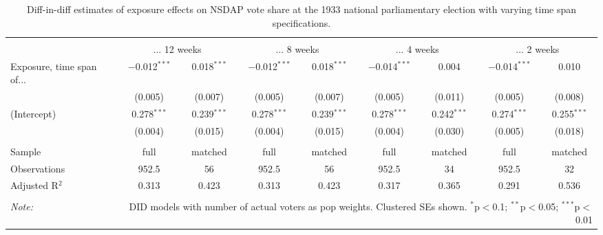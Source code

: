 
\begin{table}[!htbp] \centering 
  \caption{Diff-in-diff estimates of exposure effects on NSDAP vote share at the 1933 national parliamentary election with varying time span specifications.\vspace{-.25cm}} 
  \label{tab:nsdap-voteshare-timespan-dd-1933} 
\scriptsize 
\begin{tabular}{@{\extracolsep{5pt}}lcccccccc} 
\\[-1.8ex]\hline 
\hline \\[-1.8ex] 
 & \multicolumn{2}{c}{... 12 weeks} & \multicolumn{2}{c}{... 8 weeks} & \multicolumn{2}{c}{... 4 weeks} & \multicolumn{2}{c}{... 2 weeks} \\ 
 \cmidrule(r){2-3}\cmidrule(r){4-5}\cmidrule(r){6-7}\cmidrule(r){8-9}Exposure, time span of... & $-$0.012$^{***}$ & 0.018$^{***}$ & $-$0.012$^{***}$ & 0.018$^{***}$ & $-$0.014$^{***}$ & 0.004 & $-$0.014$^{***}$ & 0.010 \\ 
  & (0.005) & (0.007) & (0.005) & (0.007) & (0.005) & (0.011) & (0.005) & (0.008) \\ 
  (Intercept) & 0.278$^{***}$ & 0.239$^{***}$ & 0.278$^{***}$ & 0.239$^{***}$ & 0.278$^{***}$ & 0.242$^{***}$ & 0.274$^{***}$ & 0.255$^{***}$ \\ 
  & (0.004) & (0.015) & (0.004) & (0.015) & (0.004) & (0.030) & (0.005) & (0.018) \\ 
 \hline \\[-1.8ex] 
Sample & full & matched & full & matched & full & matched & full & matched \\ 
Observations & 952.5 & 56 & 952.5 & 56 & 952.5 & 34 & 952.5 & 32 \\ 
Adjusted R$^{2}$ & 0.313 & 0.423 & 0.313 & 0.423 & 0.317 & 0.365 & 0.291 & 0.536 \\ 
\hline 
\hline \\[-1.8ex] 
\textit{Note:}  & \multicolumn{8}{r}{DID models with number of actual voters as pop weights. Clustered SEs shown. $^{*}$p$<$0.1; $^{**}$p$<$0.05; $^{***}$p$<$0.01} \\ 
\end{tabular} 
\end{table} 
